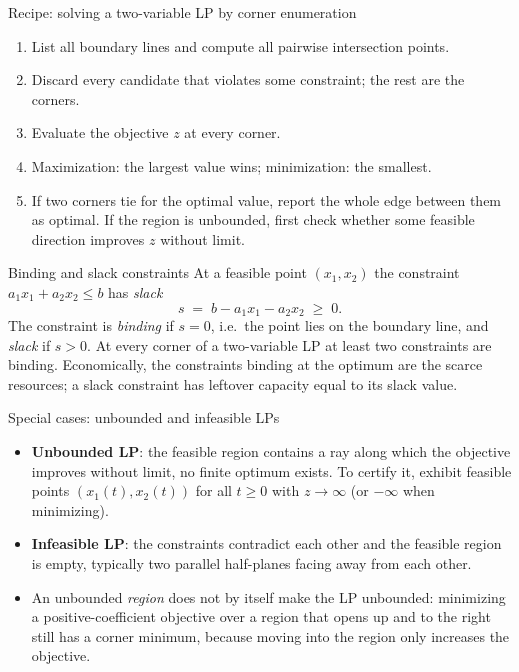\begin{rulebox}{Recipe: solving a two-variable LP by corner enumeration}
\begin{enumerate}[leftmargin=1.8em,itemsep=0.3ex]
  \item List all boundary lines and compute all pairwise intersection
        points.
  \item Discard every candidate that violates some constraint; the rest are
        the corners.
  \item Evaluate the objective $z$ at every corner.
  \item Maximization: the largest value wins; minimization: the smallest.
  \item If two corners tie for the optimal value, report the whole edge
        between them as optimal. If the region is unbounded, first check
        whether some feasible direction improves $z$ without limit.
\end{enumerate}
\end{rulebox}

\begin{rulebox}{Binding and slack constraints}
At a feasible point $(x_{1},x_{2})$ the constraint
$a_{1}x_{1}+a_{2}x_{2}\le b$ has \emph{slack}
\[
  s \;=\; b-a_{1}x_{1}-a_{2}x_{2}\;\ge\;0 .
\]
The constraint is \emph{binding} if $s=0$, i.e.\ the point
lies on the boundary line, and \emph{slack} if $s>0$.
At every corner of a two-variable LP at least two constraints are binding.
Economically, the constraints binding at the optimum are the scarce
resources; a slack constraint has leftover capacity equal to its slack
value.
\end{rulebox}

\begin{rulebox}{Special cases: unbounded and infeasible LPs}
\begin{itemize}[leftmargin=1.6em,itemsep=0.3ex]
  \item \textbf{Unbounded LP}: the feasible region
        contains a ray along which the objective improves without limit,
        no finite optimum exists. To certify it, exhibit feasible points
        $(x_{1}(t),x_{2}(t))$ for all $t\ge 0$ with $z\to\infty$ (or
        $-\infty$ when minimizing).
  \item \textbf{Infeasible LP}: the constraints
        contradict each other and the feasible region is empty,
        typically two parallel half-planes facing away from each other.
  \item An unbounded \emph{region} does not by itself make the LP
        unbounded: minimizing a positive-coefficient objective over a
        region that opens up and to the right still has a corner minimum,
        because moving into the region only increases the objective.
\end{itemize}
\end{rulebox}

